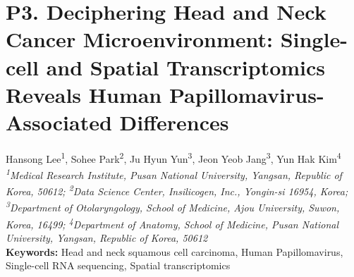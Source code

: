 \section*{P3. Deciphering Head and Neck Cancer Microenvironment: Single-cell and Spatial Transcriptomics Reveals Human Papillomavirus-Associated Differences}

\begin{center}
Hansong Lee\textsuperscript{1}, Sohee Park\textsuperscript{2}, Ju Hyun Yun\textsuperscript{3}, Jeon Yeob Jang\textsuperscript{3}, Yun Hak Kim\textsuperscript{4} \\
\vspace{0.2cm}
\textit{\textsuperscript{1}Medical Research Institute, Pusan National University, Yangsan, Republic of Korea, 50612; \textsuperscript{2}Data Science Center, Insilicogen, Inc., Yongin-si 16954, Korea; \textsuperscript{3}Department of Otolaryngology, School of Medicine, Ajou University, Suwon, Korea, 16499; \textsuperscript{4}Department of Anatomy, School of Medicine, Pusan National University, Yangsan, Republic of Korea, 50612} \\
\vspace{0.2cm}
\textbf{Keywords:} Head and neck squamous cell carcinoma, Human Papillomavirus, Single-cell RNA sequencing, Spatial transcriptomics
\end{center}

